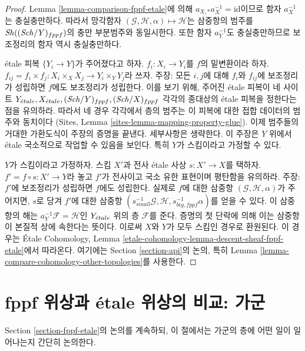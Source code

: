 \begin{proof}
Lemma \ref{lemma-comparison-fppf-etale}에 의해
$a_{X, *}a_X^{-1} = \text{id}$이므로 함자 $a_X^{-1}$는 충실충만하다.
따라서 망각함자
$(\mathcal{G}, \mathcal{H}, \alpha) \mapsto \mathcal{H}$는 삼중항의
범주를 $\mathop{\mathit{Sh}}\nolimits((\mathit{Sch}/Y)_{fppf})$의 충만 부분범주와 동일시한다.
또한 함자 $a_Y^{-1}$도 충실충만하므로 보조정리의 함자 역시
충실충만하다.

\medskip\noindent
\'etale 피복 $\{Y_i \to Y\}$가 주어졌다고 하자.
$f_i : X_i \to Y_i$를 $f$의 밑변환이라 하자.
$f_{ij} = f_i \times f_j : X_i \times_X X_j  \to Y_i \times_Y Y_j$라 쓰자.
주장: 모든 $i, j$에 대해 $f_i$와 $f_{ij}$에 보조정리가 성립하면
$f$에도 보조정리가 성립한다. 이를 보기 위해, 주어진 \'etale 피복이
네 사이트 $Y_{\acute{e}tale}, X_{\acute{e}tale}, (\mathit{Sch}/Y)_{fppf}, (\mathit{Sch}/X)_{fppf}$
각각의 종대상의 \'etale 피복을 정한다는 점을 유의하라.
따라서 네 경우 각각에서 층의 범주는 이 피복에 대한 접합 데이터의
범주와 동치이다
(Sites, Lemma \ref{sites-lemma-mapping-property-glue}).
이제 범주들의 거대한 가환도식이 주장의 증명을 끝낸다.
세부사항은 생략한다. 이 주장은 $Y$ 위에서 \'etale 국소적으로
작업할 수 있음을 보인다. 특히 $Y$가 스킴이라고 가정할 수 있다.

\medskip\noindent
$Y$가 스킴이라고 가정하자. 스킴 $X'$과 전사 \'etale 사상
$s : X' \to X$를 택하자. $f' = f \circ s : X' \to Y$라 놓고
$f'$가 전사이고 국소 유한 표현이며 평탄함을 유의하라.
주장: $f'$에 보조정리가 성립하면 $f$에도 성립한다.
실제로 $f$에 대한 삼중항 $(\mathcal{G}, \mathcal{H}, \alpha)$가
주어지면, $s$로 당겨 $f'$에 대한 삼중항
$(s_{small}^{-1}\mathcal{G}, \mathcal{H}, s_{big, fppf}^{-1}\alpha)$를
얻을 수 있다. 이 삼중항의 해는 $a_Y^{-1}\mathcal{F} = \mathcal{H}$인
$Y_{\acute{e}tale}$ 위의 층 $\mathcal{F}$를 준다. 증명의 첫 단락에 의해 이는
삼중항이 본질적 상에 속한다는 뜻이다. 이로써 $X$와 $Y$가 모두
스킴인 경우로 환원된다. 이 경우는 \'Etale Cohomology, Lemma
\ref{etale-cohomology-lemma-descent-sheaf-fppf-etale}에서 따라온다.
여기에는 Section \ref{section-api}의 논의, 특히 Lemma
\ref{lemma-compare-cohomology-other-topologies}를 사용한다.
\end{proof}


\section{fppf 위상과 \'etale 위상의 비교: 가군}
\label{section-fppf-etale-modules}

\noindent
Section \ref{section-fppf-etale}의 논의를 계속하되, 이 절에서는
가군의 층에 어떤 일이 일어나는지 간단히 논의한다.

